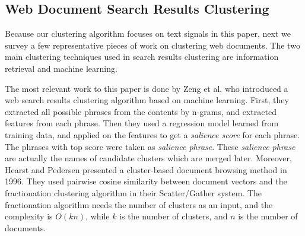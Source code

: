 

\subsection{Web Document Search Results Clustering}

Because our clustering algorithm focuses on text signals in this paper,
next we survey a few representative pieces of work on clustering web documents.
The two main clustering techniques
used in search results clustering are information retrieval and machine
learning\cite{Leouski1996,ZamirE98,ZamirE99}.

The most relevant work to this paper is done by
Zeng et al.\cite{Zeng2004} who introduced a web search results clustering algorithm
based on machine learning. First, they extracted all possible phrases from the
contents by n-grams, and extracted features from each phrase. Then they used
a regression model learned from training data, and applied on the features to
get a \textit{salience score} for each phrase. The phrases with top score were taken
as \textit{salience phrase}. These \textit{salience phrase} are actually the
names of candidate clusters which are merged later.
Moreover, Hearst and Pedersen\cite{Hearst1996} presented a cluster-based document
browsing method in 1996. They used pairwise cosine similarity between document
vectors and the fractionation clustering algorithm in their Scatter/Gather
system. The fractionation algorithm needs the number of clusters as an input, and the
complexity is $O(kn)$, while $k$ is the number of clusters, and $n$
is the number of documents.

